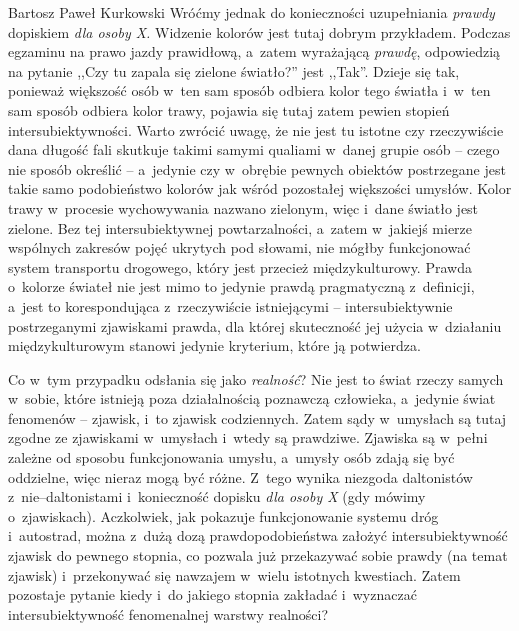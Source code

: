 \begin{artplenv}{Bartosz Paweł Kurkowski}
Wróćmy jednak do konieczności uzupełniania \textit{prawdy} dopiskiem \textit{dla osoby X.} Widzenie kolorów jest tutaj
dobrym przykładem. Podczas egzaminu na prawo jazdy prawidłową, a~zatem wyrażającą \textit{prawdę}, odpowiedzią na
pytanie ,,Czy tu zapala się zielone światło?'' jest ,,Tak''. Dzieje się tak, ponieważ większość osób w~ten sam sposób
odbiera kolor tego światła i~w~ten sam sposób odbiera kolor trawy, pojawia się tutaj zatem pewien stopień
intersubiektywności. Warto zwrócić uwagę, że nie jest tu istotne czy rzeczywiście dana długość fali skutkuje takimi
samymi qualiami w~danej grupie osób -- czego nie sposób określić -- a~jedynie czy w~obrębie pewnych obiektów postrzegane
jest takie samo podobieństwo kolorów jak wśród pozostałej większości umysłów. Kolor trawy w~procesie wychowywania
nazwano zielonym, więc i~dane światło jest zielone. Bez tej intersubiektywnej powtarzalności, a~zatem w~jakiejś mierze
wspólnych zakresów pojęć ukrytych pod słowami, nie mógłby funkcjonować system transportu drogowego, który jest przecież
międzykulturowy. Prawda o~kolorze świateł nie jest mimo to jedynie prawdą pragmatyczną z~definicji, a~jest to
korespondująca z~rzeczywiście istniejącymi -- intersubiektywnie postrzeganymi zjawiskami prawda, dla której skuteczność
jej użycia w~działaniu międzykulturowym stanowi jedynie kryterium, które ją potwierdza.


Co w~tym przypadku odsłania się jako \textit{realność}? Nie jest to świat rzeczy samych w~sobie, które istnieją poza
działalnością poznawczą człowieka, a~jedynie świat fenomenów -- zjawisk, i~to zjawisk codziennych. Zatem sądy w~umysłach
są tutaj zgodne ze zjawiskami w~umysłach i~wtedy są prawdziwe. Zjawiska są w~pełni zależne od sposobu funkcjonowania
umysłu, a~umysły osób zdają się być oddzielne, więc nieraz mogą być różne. Z~tego wynika niezgoda
daltonistów z~nie–daltonistami i~konieczność dopisku \textit{dla osoby X} (gdy mówimy o~zjawiskach). Aczkolwiek, jak pokazuje
funkcjonowanie systemu dróg i~autostrad, można z~dużą dozą prawdopodobieństwa założyć intersubiektywność zjawisk do
pewnego stopnia, co pozwala już przekazywać sobie prawdy (na temat zjawisk) i~przekonywać się nawzajem w~wielu
istotnych kwestiach. Zatem pozostaje pytanie kiedy i~do jakiego stopnia zakładać i~wyznaczać intersubiektywność
fenomenalnej warstwy realności?



\end{artplenv}
